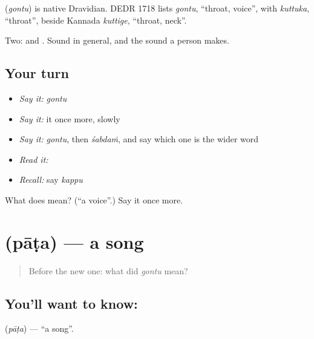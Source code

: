 \begin{cousinweb}
\textbf{} (\emph{gontu}) is native Dravidian. DEDR 1718 lists \emph{gontu}, \textquotedblleft{}throat, voice\textquotedblright{}, with \emph{kuttuka}, \textquotedblleft{}throat\textquotedblright{}, beside Kannada \emph{kuttige}, \textquotedblleft{}throat, neck\textquotedblright{}.
\end{cousinweb}

\begin{grammarlens}[title={What you've built}]
Two:  and . Sound in general, and the sound a person makes.
\end{grammarlens}

\subsection*{Your turn}
\begin{itemize}
\raggedright
  \item \emph{Say it:} \emph{gontu}
  \item \emph{Say it:} it once more, slowly
  \item \emph{Say it:} \emph{gontu}, then \emph{śabdaṁ}, and say which one is the wider word
  \item \emph{Read it:} \textbf{}
  \item \emph{Recall:} say \emph{kappu}
\end{itemize}

\begin{tcolorbox}[breakable,colback=teal!4,colframe=teal!35!black,title={Before you move on}]
What does  mean? (\textquotedblleft{}a voice\textquotedblright{}.) Say it once more.
\end{tcolorbox}
\section[\texorpdfstring{\te{పాట} (pāṭa)}{పాట (pāṭa)}]{ (pāṭa) — a song}

\label{lesson:TE-C68-song}



\begin{quote}
Before the new one: what did \emph{gontu} mean?
\end{quote}

\subsection*{You'll want to know: }
\textbf{} (\emph{pāṭa}) — \textquotedblleft{}a song\textquotedblright{}.

